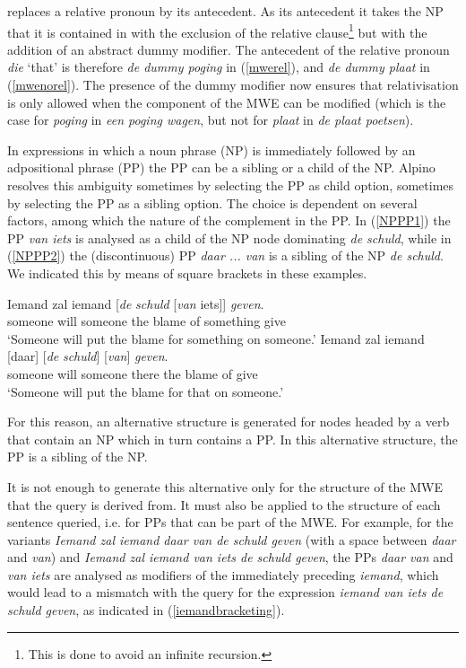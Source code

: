 \documentclass[output=paper,colorlinks,citecolor=brown]{langscibook}
\begin{document}
{\mwefinder} replaces a relative pronoun by its antecedent. As its antecedent it takes the NP that it is contained in with the exclusion of the relative clause\footnote{This is done to avoid an infinite recursion.} but with the addition of an abstract dummy modifier. The antecedent of the relative pronoun \textit{die} `that' is therefore \textit{de dummy poging} in (\ref{mwerel}), and \textit{de dummy plaat} in (\ref{mwenorel}). The presence of the dummy modifier now ensures that relativisation is only allowed when the component of the MWE can be modified (which is the case for \textit{poging} in \textit{een poging wagen}, but not for \textit{plaat} in \textit{de plaat poetsen}).

 In expressions in which a noun phrase (NP) is immediately followed by an adpositional phrase (PP) the PP can be a sibling or a child of the NP. Alpino resolves this ambiguity sometimes by selecting the PP as child option, sometimes by selecting the PP as a sibling option. The choice is dependent on several factors, among which the nature of the complement in the PP. In (\ref{NPPP1}) the PP \textit{van iets} is analysed as a child of the NP node dominating \textit{de schuld}, while in (\ref{NPPP2}) the (discontinuous) PP \textit{daar ... van} is a sibling of the NP \textit{de schuld}. We indicated this by means of square brackets in these examples.

\begin{exe}
\ex \gll Iemand zal iemand  [\textit{de} \textit{schuld} [\textit{van} iets]] \textit{geven}.\\
someone will someone the blame of something give\\  \label{NPPP1}
\glt `Someone will put the blame for something on someone.'
\ex \gll Iemand zal iemand  [daar] [\textit{de} \textit{schuld}] [\textit{van}] \textit{geven}.\\
someone will someone there the blame of give\\ \label{NPPP2}
\glt `Someone will put the blame for that on someone.'
\end{exe}

For this reason, an alternative structure is generated for nodes headed by a verb that contain an NP which in turn contains a PP. In this alternative structure, the PP is a sibling of the NP.

It is not enough to generate this alternative only for the structure of the MWE that the query is derived from. It must also be applied to the structure of each sentence queried, i.e. for PPs that can be part of the MWE. For example, for the variants \textit{Iemand zal iemand daar van de schuld geven} (with a space between \textit{daar} and \textit{van}) and \textit{Iemand zal iemand van iets de schuld geven}, the PPs \textit{daar van} and \textit{van iets} are analysed as modifiers of the immediately preceding \textit{iemand}, which would lead to a mismatch with the query for the expression \textit{iemand van iets de schuld geven}, as indicated in (\ref{iemandbracketing}).
\end{document}
